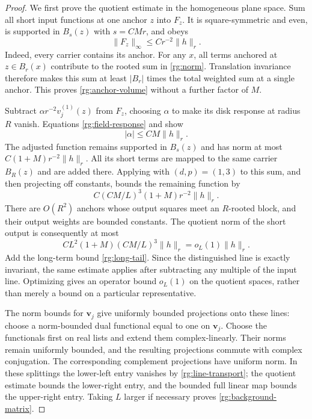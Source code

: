 \begin{proof}
We first prove the quotient estimate in the homogeneous plane space.
Sum all short input functions at one anchor $z$ into $F_z$.  It is
square-symmetric and even, is supported in $B_s(z)$ with $s=CMr$, and
obeys
\begin{equation}
 \|F_z\|_\infty\le Cr^{-2}\|h\|_r.
 \label{rg:anchor-volume}
\end{equation}
Indeed, every carrier contains its anchor.  For any $x$, all terms
anchored at $z\in B_r(x)$ contribute to the rooted sum in
\eqref{rg:norm}.  Translation invariance therefore makes this sum at
least $|B_r|$ times the total weighted sum at a single anchor.  This
proves \eqref{rg:anchor-volume} without a further factor of $M$.

Subtract $\alpha r^{-2}v_j^{(1)}(z)$ from $F_z$, choosing $\alpha$ to
make its disk response at radius $R$ vanish.  Equations
\eqref{rg:field-response} and  show
\[
 |\alpha|\le CM\|h\|_r.
\]
The adjusted function remains supported in $B_s(z)$ and has norm at
most $C(1+M)r^{-2}\|h\|_r$.  All its short terms are mapped to the
same carrier $B_R(z)$ and are added there.  Applying
 with $(d,p)=(1,3)$ to this sum, and then projecting
off constants, bounds the remaining function by
\[
 C(CM/L)^3(1+M)r^{-2}\|h\|_r.
\]
There are $O(R^2)$ anchors whose output squares meet an $R$-rooted block,
and their output weights are bounded constants.  The quotient norm of
the short output is consequently at most
\begin{equation}
 C L^2(1+M)(CM/L)^3\|h\|_r=o_L(1)\|h\|_r.
 \label{rg:bulk-quotient}
\end{equation}
Add the long-term bound \eqref{rg:long-tail}.  Since the distinguished
line is exactly invariant, the same estimate applies after subtracting
any multiple of the input line.  Optimizing gives an operator bound
$o_L(1)$ on the quotient spaces, rather than merely a bound on a
particular representative.

The norm bounds for $\boldsymbol v_j$ give uniformly bounded projections
onto these lines: choose a norm-bounded dual functional equal to one on
$\boldsymbol v_j$.  Choose the functionals first on real lists and
extend them complex-linearly.  Their norms remain uniformly bounded,
and the resulting projections commute with complex conjugation.
The corresponding complement projections have
uniform norm.  In these splittings the lower-left entry vanishes by
\eqref{rg:line-transport}; the quotient estimate bounds the lower-right
entry, and the bounded full linear map bounds the upper-right entry.
Taking $L$ larger if necessary proves
\eqref{rg:background-matrix}.


\end{proof}
